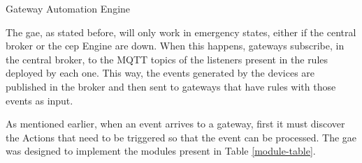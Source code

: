 \begin{Paragraph}{Gateway Automation Engine}

The \acf{gae}, as stated before, will only work in emergency states, either if the central broker or the \ac{cep} Engine are down. When this happens, gateways subscribe, in the central broker, to the MQTT topics of the listeners present in the rules deployed by each one. This way, the events generated by the devices are published in the broker and then sent to gateways that have rules with those events as input. 

As mentioned earlier, when an event arrives to a gateway, first it must discover the Actions that need to be triggered so that the event can be processed. The \ac{gae} was designed to implement the modules present in Table \ref{module-table}.
 
\begin{table}[H]


\end{table}
\end{Paragraph}
